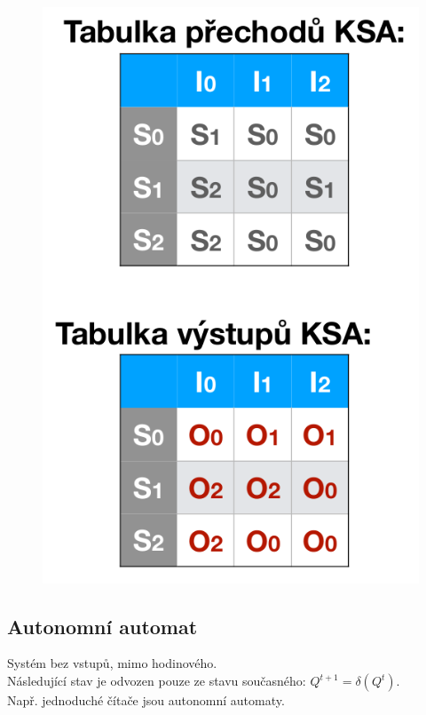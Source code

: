 \begin{figure}[h!]
\begin{minipage}[b]{0.4\textwidth}
        \includegraphics[scale = 0.2]{img/Mealy tabulky.png}
    \end{minipage}
\end{figure}

\subsection{Autonomní automat}
Systém bez vstupů, mimo hodinového.\\
Následující stav je odvozen pouze ze stavu současného: \(Q^{t+1} = \delta(Q^t)\).\\
Např. jednoduché čítače jsou autonomní automaty.\\
